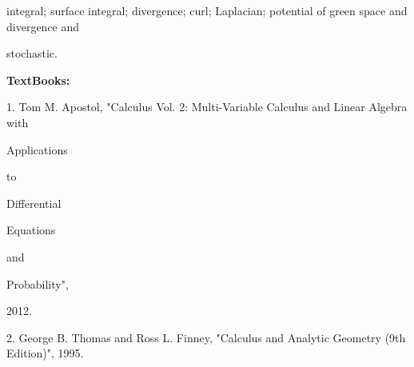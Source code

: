 \documentclass[12pt,a4paper]{article}
\begin{document}
integral; surface integral; divergence; curl; Laplacian; potential of green space and divergence and\par
stochastic.\par\vspace{4pt}
\textbf{TextBooks:}\par\vspace{2pt}
1. Tom M. Apostol, "Calculus Vol. 2: Multi-Variable Calculus and Linear Algebra with\par
Applications\par
to\par
Differential\par
Equations\par
and\par
Probability",\par
2012.\par
2. George B. Thomas and Ross L. Finney, "Calculus and Analytic Geometry (9th Edition)", 1995.\par
\vspace{4pt}
\end{document}
